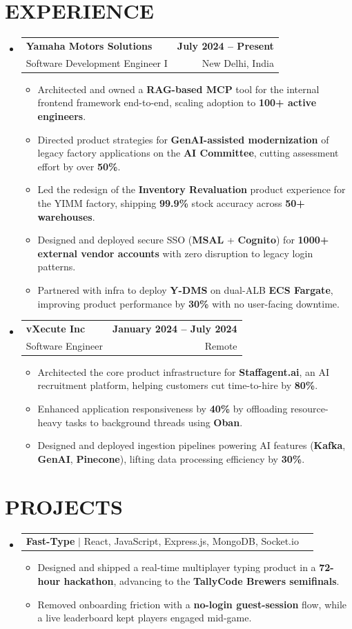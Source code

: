 \documentclass[letterpaper,10pt]{article}
\makeatletter
\renewcommand{\normalsize}{%
  \fontsize{10.1}{12.25}\selectfont
}
\newcommand{\resumeItem}[1]{
  \item\normalsize{
    {#1}
  }
}
\newcommand{\resumeSubheading}[4]{
  \item
    \begin{tabular*}{1.0\textwidth}[t]{l@{\extracolsep{\fill}}r}
      \textbf{\normalsize#1} & \textbf{\normalsize#2} \\
      {\normalsize#3} & {\normalsize#4} \\
    \end{tabular*}\vspace{1pt}
}
\newcommand{\resumeProjectHeading}[2]{
  \item
    \begin{tabular*}{1.0\textwidth}{l@{\extracolsep{\fill}}r}
      \normalsize#1 & \textbf{\normalsize#2}\\
    \end{tabular*}\vspace{2pt}
}
\newcommand{\resumeSubHeadingListStart}{\begin{itemize}[leftmargin=0.0in, label={}, itemsep=6pt, topsep=2pt]}
\newcommand{\resumeSubHeadingListEnd}{\end{itemize}}
\newcommand{\resumeItemListStart}{\begin{itemize}}
\newcommand{\resumeItemListEnd}{\end{itemize}\vspace{-3pt}}
\makeatother
\begin{document}
\section{EXPERIENCE}
  \resumeSubHeadingListStart

    \resumeSubheading
      {Yamaha Motors Solutions}{July 2024 -- Present}
      {Software Development Engineer I}{New Delhi, India}
      \resumeItemListStart
        \resumeItem{Architected and owned a \textbf{RAG-based MCP} tool for the internal frontend framework end-to-end, scaling adoption to \textbf{100+ active engineers}.}
        \resumeItem{Directed product strategies for \textbf{GenAI-assisted modernization} of legacy factory applications on the \textbf{AI Committee}, cutting assessment effort by over \textbf{50\%}.}
        \resumeItem{Led the redesign of the \textbf{Inventory Revaluation} product experience for the YIMM factory, shipping \textbf{99.9\%} stock accuracy across \textbf{50+ warehouses}.}
        \resumeItem{Designed and deployed secure SSO (\textbf{MSAL} + \textbf{Cognito}) for \textbf{1000+ external vendor accounts} with zero disruption to legacy login patterns.}
        \resumeItem{Partnered with infra to deploy \textbf{Y-DMS} on dual-ALB \textbf{ECS Fargate}, improving product performance by \textbf{30\%} with no user-facing downtime.}
      \resumeItemListEnd

    \resumeSubheading
      {vXecute Inc}{January 2024 -- July 2024}
      {Software Engineer}{Remote}
      \resumeItemListStart
        \resumeItem{Architected the core product infrastructure for \textbf{Staffagent.ai}, an AI recruitment platform, helping customers cut time-to-hire by \textbf{80\%}.}
        \resumeItem{Enhanced application responsiveness by \textbf{40\%} by offloading resource-heavy tasks to background threads using \textbf{Oban}.}
        \resumeItem{Designed and deployed ingestion pipelines powering AI features (\textbf{Kafka}, \textbf{GenAI}, \textbf{Pinecone}), lifting data processing efficiency by \textbf{30\%}.}
      \resumeItemListEnd

  \resumeSubHeadingListEnd

\section{PROJECTS}
  \resumeSubHeadingListStart
    \resumeProjectHeading
      {\textbf{Fast-Type} $|$ \textnormal{React, JavaScript, Express.js, MongoDB, Socket.io}}{}
      \resumeItemListStart
        \resumeItem{Designed and shipped a real-time multiplayer typing product in a \textbf{72-hour hackathon}, advancing to the \textbf{TallyCode Brewers semifinals}.}
        \resumeItem{Removed onboarding friction with a \textbf{no-login guest-session} flow, while a live leaderboard kept players engaged mid-game.}
      \resumeItemListEnd
  \resumeSubHeadingListEnd
\end{document}
